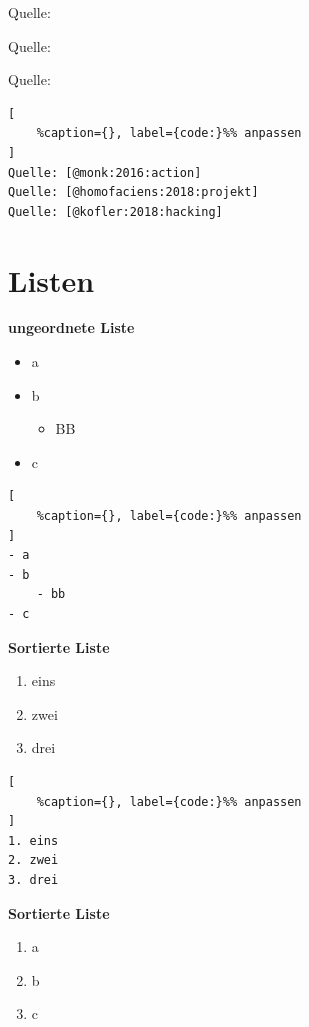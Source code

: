 Quelle: \textcite{spanner:2019:robotik}

Quelle: \textcite{homofaciens:2018:projekt}

Quelle: \textcite{kofler:2018:hacking}

\lstset{language=Bash}%
\begin{lstlisting}[
	%caption={}, label={code:}%% anpassen
]
Quelle: [@monk:2016:action]
Quelle: [@homofaciens:2018:projekt]
Quelle: [@kofler:2018:hacking]
\end{lstlisting}

\section{Listen}\label{listen}

\textbf{ungeordnete Liste}

\begin{itemize}
\item
  a
\item
  b

  \begin{itemize}
  \item
    BB
  \end{itemize}
\item
  c
\end{itemize}

\lstset{language=Bash}%
\begin{lstlisting}[
	%caption={}, label={code:}%% anpassen
]
- a
- b
    - bb
- c
\end{lstlisting}

\textbf{Sortierte Liste}

\begin{enumerate}
\item
  eins
\item
  zwei
\item
  drei
\end{enumerate}

\lstset{language=Bash}%
\begin{lstlisting}[
	%caption={}, label={code:}%% anpassen
]
1. eins
2. zwei
3. drei
\end{lstlisting}

\textbf{Sortierte Liste}

\begin{enumerate}
\def\labelenumi{\alph{enumi})}
\item
  a
\item
  b
\item
  c
\end{enumerate}

